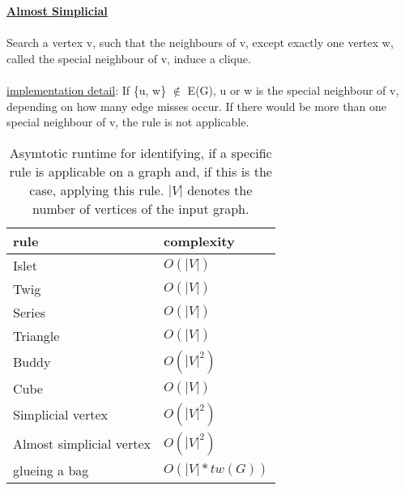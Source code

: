 \documentclass[a4wide]{article}
\begin{document}
\begin{minipage}{0.5\textwidth}
\underline{\textbf{Almost Simplicial}} \cite{B_tc3} \\ \\
Search a vertex v, such that the neighbours of v, except exactly one vertex w, called the special neighbour of v, induce a clique. \\ \\
\underline{implementation detail}: If \{u, w\} $\notin$ E(G), u or w is the special neighbour of v, depending on how many edge misses occur. If there would be more than one special neighbour of v, the rule is not applicable. \\
\end{minipage}
\hspace{2.0cm}
\begin{minipage}{0.5\textwidth}
\end{minipage}

\begin{table}[h!]
\begin{tabular}{|l|l|}
\hline 
rule & complexity \\
\hline  
Islet & $O(|V|)$ \\
Twig &$O(|V|)$ \\
Series &$O(|V|)$ \\
Triangle &$O(|V|)$ \\
Buddy &$O(|V|^2)$ \\
Cube &$O(|V|)$ \\
Simplicial vertex &$O(|V|^2)$ \\
Almost simplicial vertex &$O(|V|^2)$ \\
glueing a bag &$O(|V|*tw(G))$ \\
\hline
\end{tabular}
\caption{Asymtotic runtime for identifying, if a specific rule is applicable on a graph and, if this is the case, applying this rule. $|V|$ denotes the number of vertices of the input graph.} 
\end{table}
\end{document}
